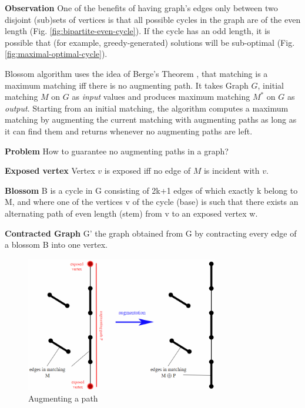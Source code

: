 \textbf{Observation} One of the benefits of having graph's edges only between two disjoint (sub)sets of vertices is that all possible cycles in the graph are of the even length (Fig. \ref{fig:bipartite-even-cycle}). If the cycle has an odd length, it is possible that (for example, greedy-generated) solutions will be sub-optimal (Fig. \ref{fig:maximal-optimal-cycle}).

Blossom algorithm uses the idea of Berge’s Theorem \cite{berge1957two}, that
matching is a maximum matching iff there is no augmenting path.
It takes Graph $G$, initial matching $M$ on $G$ as \textit{input} values and produces maximum matching $M^*$ on $G$ as \textit{output}. Starting from an initial matching, the algorithm computes a maximum matching by augmenting the current matching with augmenting paths as long as it can find them and returns whenever no augmenting paths are left. 

\textbf{Problem} How to guarantee no augmenting paths in a graph?

\begin{definition}
	\textbf{Exposed vertex} Vertex $v$ is exposed iff no edge of $M$ is incident with $v$.
\end{definition}

\begin{definition}
	\textbf{Blossom} B is a cycle in G consisting of 2k+1 edges of which exactly k belong to M, and where one of the vertices v of the cycle (base) is such that there exists an alternating path of even length (stem) from v to an exposed vertex w.
\end{definition}

\begin{definition}
	\textbf{Contracted Graph} G’ the graph obtained from G by contracting every edge of a blossom B into one vertex.
\end{definition}

\begin{figure}
	\centering
	\includegraphics[width=0.75\textwidth]{img/Edmonds_augmenting_path.png}
	\caption{Augmenting a path}
	\label{fig:augmenting-a-path}
\end{figure}

